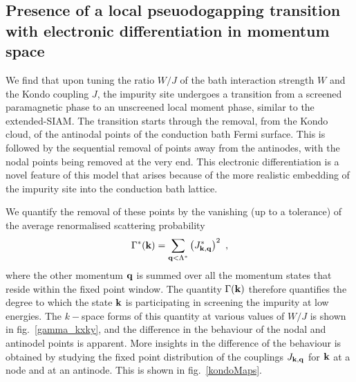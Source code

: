 \documentclass[reprint,hidelinks]{revtex4-2}
\begin{document}
\subsection{Presence of a local pseuodogapping transition with electronic differentiation in momentum space}
We find that upon tuning the ratio \(W/J\) of the bath interaction strength \(W\) and the Kondo coupling  \(J\), the impurity site undergoes a transition from a screened paramagnetic phase to an unscreened local moment phase, similar to the extended-SIAM. The transition starts through the removal, from the Kondo cloud, of the antinodal points of the conduction bath Fermi surface. This is followed by the sequential removal of points away from the antinodes, with the nodal points being removed at the very end. This electronic differentiation is a novel feature of this model that arises because of the more realistic embedding of the impurity site into the conduction bath lattice.

We quantify the removal of these points by the vanishing (up to a tolerance) of the average renormalised scattering probability 
\begin{equation}\begin{aligned}
	\Gamma^*({\bf k}) = \sum_{{\bf q} < \Lambda^*} \left(J^*_{{\bf k}, {\bf q}}\right)^2~,
\end{aligned}\end{equation}
where the other momentum \({\bf q}\) is summed over all the momentum states that reside within the fixed point window. The quantity \(\Gamma({\bf k})\) therefore quantifies the degree to which the state \({\bf k}\) is participating in screening the impurity at low energies. The \(k-\)space forms of this quantity at various values of \(W/J\) is shown in fig.~\ref{gamma_kxky}, and the difference in the behaviour of the nodal and antinodel points is apparent. More insights in the difference of the behaviour is obtained by studying the fixed point distribution of the couplings \(J_{{\bf k}, {\bf q}}\) for \({\bf k}\) at a node and at an antinode. This is shown in fig.~\ref{kondoMaps}.
\end{document}
